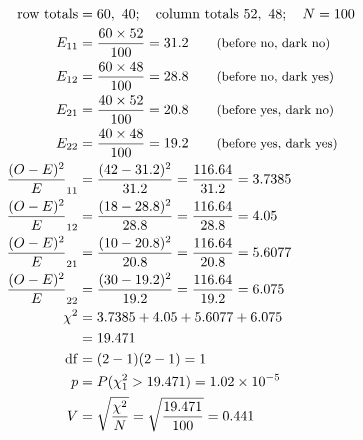 \begin{align*}
\text{row totals} &= 60,\ 40; \quad \text{column totals}\ 52,\ 48; \quad N = 100 \\
E_{11} &= \frac{60 \times 52}{100} = 31.2 \qquad \text{\small (before no, dark no)} \\
E_{12} &= \frac{60 \times 48}{100} = 28.8 \qquad \text{\small (before no, dark yes)} \\
E_{21} &= \frac{40 \times 52}{100} = 20.8 \qquad \text{\small (before yes, dark no)} \\
E_{22} &= \frac{40 \times 48}{100} = 19.2 \qquad \text{\small (before yes, dark yes)} \\
\frac{(O - E)^2}{E}_{11} &= \frac{(42 - 31.2)^2}{31.2} = \frac{116.64}{31.2} = 3.7385 \\
\frac{(O - E)^2}{E}_{12} &= \frac{(18 - 28.8)^2}{28.8} = \frac{116.64}{28.8} = 4.05 \\
\frac{(O - E)^2}{E}_{21} &= \frac{(10 - 20.8)^2}{20.8} = \frac{116.64}{20.8} = 5.6077 \\
\frac{(O - E)^2}{E}_{22} &= \frac{(30 - 19.2)^2}{19.2} = \frac{116.64}{19.2} = 6.075 \\
\chi^2 &= 3.7385 + 4.05 + 5.6077 + 6.075 \\
 &= 19.471 \\
\mathrm{df} &= (2 - 1)(2 - 1) = 1 \\
p &= P(\chi^2_1 > 19.471) = 1.02\times 10^{-5} \\
V &= \sqrt{\frac{\chi^2}{N}} = \sqrt{\frac{19.471}{100}} = 0.441
\end{align*}
